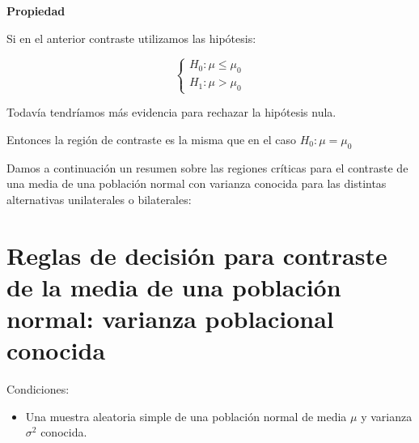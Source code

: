 \documentclass[12pt]{report}
\begin{document}
\textbf{Propiedad}

Si en el anterior contraste utilizamos las hipótesis:

   $$\left\{\begin{array}{l}
    H_{0}:\mu\leq\mu_{0}\\
    H_{1}:\mu>\mu_{0}
    \end{array}\right.$$

    Todavía tendríamos más evidencia para rechazar la hipótesis nula.

    Entonces la región de contraste es la misma que en el caso
    $H_{0}:\mu=\mu_{0}$

    Damos a continuación un resumen sobre las regiones críticas para
    el contraste de una media de una población normal con varianza
    conocida para las distintas alternativas unilaterales o
    bilaterales:

    \section{Reglas de decisión para contraste de la media de una población normal: varianza
    poblacional conocida}

    Condiciones:

    \begin{itemize}
    \item Una muestra aleatoria simple de una población normal de media $\mu$ y
    varianza $\sigma^2$ conocida.
    \end{itemize}
\end{document}
